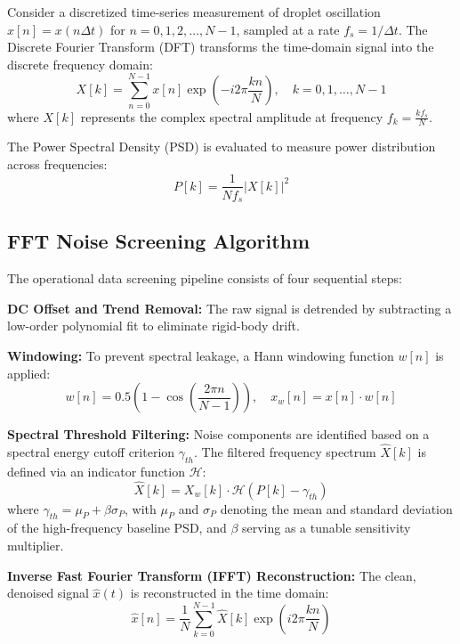 \documentclass[11pt,a4paper]{article}
\begin{document}
Consider a discretized time-series measurement of droplet oscillation $x[n] = x(n \Delta t)$ for $n = 0, 1, 2, \dots, N-1$, sampled at a rate $f_s = 1/\Delta t$. The Discrete Fourier Transform (DFT) transforms the time-domain signal into the discrete frequency domain:
\begin{equation}
X[k] = \sum_{n=0}^{N-1} x[n] \exp \left( -i 2\pi \frac{k n}{N} \right), \quad k = 0, 1, \dots, N-1
\end{equation}
where $X[k]$ represents the complex spectral amplitude at frequency $f_k = \frac{k f_s}{N}$.

The Power Spectral Density (PSD) is evaluated to measure power distribution across frequencies:
\begin{equation}
P[k] = \frac{1}{N f_s} \left| X[k] \right|^2
\end{equation}

\subsection{FFT Noise Screening Algorithm}

The operational data screening pipeline consists of four sequential steps:
\begin{1}
    \item \textbf{DC Offset and Trend Removal:} The raw signal is detrended by subtracting a low-order polynomial fit to eliminate rigid-body drift.
    \item \textbf{Windowing:} To prevent spectral leakage, a Hann windowing function $w[n]$ is applied:
    \begin{equation}
    w[n] = 0.5 \left( 1 - \cos\left( \frac{2\pi n}{N-1} \right) \right), \quad x_w[n] = x[n] \cdot w[n]
    \end{equation}
    \item \textbf{Spectral Threshold Filtering:} Noise components are identified based on a spectral energy cutoff criterion $\gamma_{th}$. The filtered frequency spectrum $\hat{X}[k]$ is defined via an indicator function $\mathcal{H}$:
    \begin{equation}
    \hat{X}[k] = X_w[k] \cdot \mathcal{H} \left( P[k] - \gamma_{th} \right)
    \end{equation}
    where $\gamma_{th} = \mu_{P} + \beta \sigma_{P}$, with $\mu_{P}$ and $\sigma_{P}$ denoting the mean and standard deviation of the high-frequency baseline PSD, and $\beta$ serving as a tunable sensitivity multiplier.
    \item \textbf{Inverse Fast Fourier Transform (IFFT) Reconstruction:} The clean, denoised signal $\hat{x}(t)$ is reconstructed in the time domain:
    \begin{equation}
    \hat{x}[n] = \frac{1}{N} \sum_{k=0}^{N-1} \hat{X}[k] \exp \left( i 2\pi \frac{k n}{N} \right)
    \end{equation}
\end{1}
\end{document}
